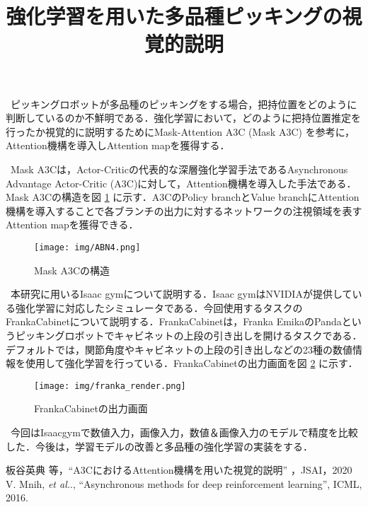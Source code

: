 \documentclass{jarticle}
\title{強化学習を用いた多品種ピッキングの視覚的説明                                                                 }
\begin{document}
\maketitle

\ ピッキングロボットが多品種のピッキングをする場合，把持位置をどのように判断しているのか不鮮明である．強化学習において，どのように把持位置推定を行ったか視覚的に説明するためにMask-Attention A3C (Mask A3C) \cite{ref2} を参考に，Attention機構を導入しAttention mapを獲得する．

\ Mask A3Cは，Actor-Criticの代表的な深層強化学習手法であるAsynchronous Advantage Actor-Critic (A3C)\cite{ref3}に対して，Attention機構を導入した手法である．Mask A3Cの構造を図 \ref{mask} に示す．A3CのPolicy branchとValue branchにAttention機構を導入することで各ブランチの出力に対するネットワークの注視領域を表すAttention mapを獲得できる．

\begin{figure}[h]
\centering
	\texttt{[image: img/ABN4.png]}
	\vspace{-4mm}
	\caption{Mask A3Cの構造}
	\vspace{-2mm}
	\label{mask}
\end{figure}

\ 本研究に用いるIsaac gymについて説明する．Isaac gymはNVIDIAが提供している強化学習に対応したシミュレータである．今回使用するタスクのFrankaCabinetについて説明する．FrankaCabinetは，Franka EmikaのPandaというピッキングロボットでキャビネットの上段の引き出しを開けるタスクである．デフォルトでは，関節角度やキャビネットの上段の引き出しなどの23種の数値情報を使用して強化学習を行っている．FrankaCabinetの出力画面を図 \ref{render} に示す．

\begin{figure}[h]
\centering
	\texttt{[image: img/franka\_render.png]}
	\vspace{-4mm}
	\caption{FrankaCabinetの出力画面}
	\vspace{-2mm}
	\label{render}
\end{figure}

\ 今回はIsaacgymで数値入力，画像入力，数値＆画像入力のモデルで精度を比較した．今後は，学習モデルの改善と多品種の強化学習の実装をする．





\begin{thebibliography}{9}
	 板谷英典 等，``A3CにおけるAttention機構を用いた視覚的説明'' ，JSAI，2020
	V. Mnih, {\it et al.}., “Asynchronous methods for deep reinforcement learning”, ICML, 2016.
\end{thebibliography}


%
%
\end{document}
